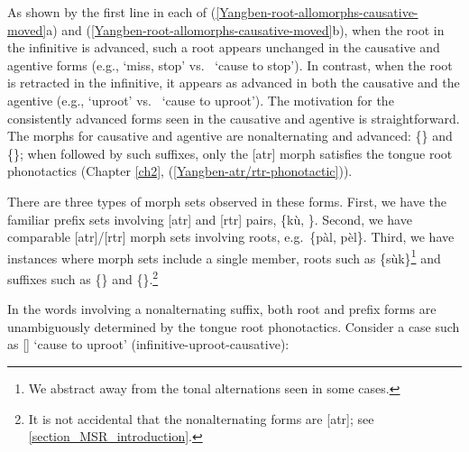 As shown by the first line in each of  (\ref{Yangben-root-allomorphs-causative-moved}a) and (\ref{Yangben-root-allomorphs-causative-moved}b), when the root in the infinitive is advanced, such a root appears unchanged in the causative and agentive forms (e.g., \ipa{[kù-sùk]} `miss, stop' vs.\ \ipa{[kù-súk-{\ì}]} `cause to stop'). In contrast, when the root is retracted in the infinitive, it appears as advanced in both the causative and the agentive (e.g., \ipa{[k\`{ʊ}-pàl]} `uproot' vs.\ \ipa{[kù-pèl-{\ì}]} `cause to uproot'). %
 The motivation for the consistently advanced forms seen in the causative and agentive is straightforward. The morphs for causative and agentive are nonalternating and advanced: \{\ipa{{\ì}}\} and \{\ipa{{\ì}}\}; when followed by such suffixes, only the [atr] morph satisfies the tongue root phonotactics (Chapter \ref{ch2}, (\ref{Yangben-atr/rtr-phonotactic})).

There are three types of morph sets observed in these forms. First, we have the familiar prefix sets involving [atr] and [rtr] pairs,  \{kù, \}. Second, we have comparable [atr]/[rtr] morph sets involving  roots, e.g.\ \{pàl, pèl\}.  %
Third, we have instances where morph sets include a single member, roots such as \{sùk\}\footnote{We abstract away from the tonal alternations seen in some cases.} and suffixes such as \{\ipa{{\ì}}\} and \{\ipa{{\ì}}\}.\footnote{It is not accidental that the nonalternating forms are [atr]; see \textsection\ref{section_MSR_introduction}.}

In the words involving a nonalternating suffix, both root and prefix forms are unambiguously determined by the tongue root phonotactics. Consider a case such as  [] `cause to uproot' ({\sc infinitive-uproot-causative}):%

